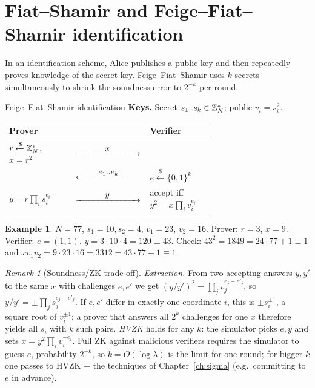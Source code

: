 \documentclass[11pt,a4paper]{report}
\makeatletter
\theoremstyle{plain}
\theoremstyle{definition}
\newtheorem{example}[theorem]{Example}
\theoremstyle{remark}
\newtheorem{remark}[theorem]{Remark}
\newcommand{\getsr}{\xleftarrow{\$}}
\newcommand{\ra}[1]{\xrightarrow{\makebox[2.5cm]{$#1$}}}
\newcommand{\la}[1]{\xleftarrow{\makebox[2.5cm]{$#1$}}}
\newcommand{\Zs}[1]{\ZZ_{#1}^{*}}
\newenvironment{flow}[2]{%
  \par\smallskip\noindent
  \begin{tabular}{@{}L{0.34\linewidth} c L{0.34\linewidth}@{}}
  \textbf{#1} & & \textbf{#2}\\ \hline}{\end{tabular}\par\smallskip}
\makeatother
\begin{document}
\section{Fiat--Shamir and Feige--Fiat--Shamir identification}
In an identification scheme, Alice publishes a public key and then repeatedly proves knowledge of the secret key. Feige--Fiat--Shamir uses $k$ secrets simultaneously to shrink the soundness error to $2^{-k}$ per round.
\begin{protocol}[label=pr:ffs]{Feige--Fiat--Shamir identification}
\textbf{Keys.} Secret $s_1..s_k\in\Zs N$; public $v_i=s_i^2$.
\begin{flow}{Prover}{Verifier}
$r\getsr\Zs N$, $x=r^2$ & $\ra{x}$ & \\
 & $\la{e_1..e_k}$ & $e\getsr\{0,1\}^k$\\
$y=r\prod_i s_i^{e_i}$ & $\ra{y}$ & accept iff $y^2=x\prod_iv_i^{e_i}$
\end{flow}
\end{protocol}
\begin{example}
$N=77$, $s_1=10,s_2=4$, $v_1=23$, $v_2=16$. Prover: $r=3$, $x=9$. Verifier: $e=(1,1)$. $y=3\cdot10\cdot4=120\equiv43$. Check: $43^2=1849=24\cdot77+1\equiv1$ and $x v_1v_2=9\cdot23\cdot16=3312=43\cdot77+1\equiv1$. \checkmark
\end{example}
\begin{remark}[Soundness/ZK trade-off]
\emph{Extraction.} From two accepting answers $y,y'$ to the same $x$ with challenges $e,e'$ we get $(y/y')^2=\prod_jv_j^{e_j-e'_j}$, so $y/y'=\pm\prod_js_j^{e_j-e'_j}$. If $e,e'$ differ in exactly one coordinate $i$, this is $\pm s_i^{\pm1}$, a square root of $v_i^{\pm1}$; a prover that answers all $2^k$ challenges for one $x$ therefore yields all $s_i$ with $k$ such pairs. \emph{HVZK} holds for any $k$: the simulator picks $e,y$ and sets $x=y^2\prod_iv_i^{-e_i}$. Full ZK against malicious verifiers requires the simulator to guess $e$, probability $2^{-k}$, so $k=O(\log\lambda)$ is the limit for one round; for bigger $k$ one passes to HVZK + the techniques of Chapter~\ref{ch:sigma} (e.g.\ committing to $e$ in advance).
\end{remark}
\end{document}
